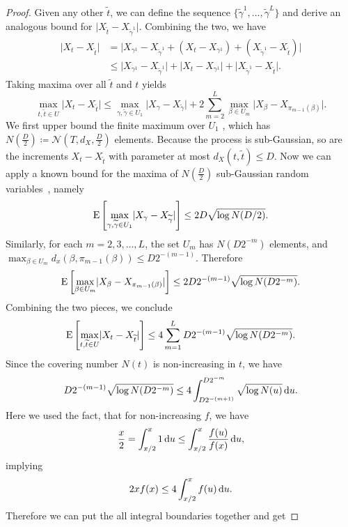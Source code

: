 \begin{proof}
Given any other $\widetilde{t}$, we can define the sequence \( \{ \widetilde{\gamma}^{1}, \dots, \widetilde{\gamma}^{L} \} \) and derive an analogous bound for \( \lvert X_{\widetilde{t}} - X_{\widetilde{\gamma}^{1}} \rvert \).
Combining the two, we have
\begin{align*}
    \lvert X_{t} - X_{\widetilde{t}} \rvert &= 
    \lvert X_{\gamma^{1}} - X_{\widetilde{\gamma}^{1}} + (X_{t} - X_{\gamma^{1}}) + (X_{\widetilde{\gamma}^{1}} - X_{\widetilde{t}}) \rvert \\
    &\leq \lvert X_{\gamma^{1}} - X_{\widetilde{\gamma}^{1}} \rvert + \lvert X_{t} - X_{\gamma^{1}} \rvert + \lvert X_{\widetilde{\gamma}^{1}} - X_{\widetilde{t}} \rvert.
\end{align*}
Taking maxima over all $\widetilde{t}$ and $t$ yields
\[
    \max_{t, \widetilde{t} \in U} \lvert X_{t} - X_{\widetilde{t}} \rvert \leq \max_{\gamma, \widetilde{\gamma} \in U_{1}} \lvert X_{\gamma}-X_{\widetilde{\gamma}}\rvert + 2 \sum_{m=2}^{L} \max_{\beta \in U_{m}} \lvert X_{\beta}- X_{\pi_{m-1}(\beta)} \rvert.
\]
We first upper bound the finite maximum over $U_{1}$ , which has \(N(\frac{D}{2}) \coloneqq \mathcal{N}(T,d_{X},\frac{D}{2}) \) elements. 
Because the process is sub-Gaussian, so are the increments \( X_{t} - X_{\widetilde{t}} \) with parameter at most \( d_{X}(t, \widetilde{t})  \leq D\). 
Now we can apply a known bound for the maxima of \( N(\frac{D}{2}) \) sub-Gaussian random variables~\cite[p. 53]{wainwright2019high}, namely
\[
    \E\left[ \max_{\gamma, \widetilde{\gamma} \in U_{1}} \lvert X_{\gamma} - X_{\widetilde{\gamma}} \rvert \right] \leq 2 D \sqrt{\log N(D/2)}.
\]
Similarly, for each \( m = 2,3, \dots, L \), the set \( U_{m} \) has \( N(D 2^{-m}) \) elements, and \( \max_{\beta \in U_{m}} d_{x}(\beta, \pi_{m-1}(\beta)) \leq D 2^{-(m-1)} \). Therefore
\[
    \E \left[ \max_{\beta \in U_{m}} \lvert X_{\beta}- X_{\pi_{m-1}(\beta)} \rvert \right] \leq 2 D 2^{-(m-1)} \sqrt{\log N(D 2^{-m})}.
\]
Combining the two pieces, we conclude
\[
    \E \left[ \max_{t, \widetilde{t} \in U} \lvert X_{t} - X_{\widetilde{t}} \rvert \right] \leq 4 \sum_{m=1}^{L} D 2^{-(m-1)} \sqrt{\log N(D 2^{-m})}.
\]
Since the covering number \( N(t) \) is non-increasing in \( t \), we have
\[
    D 2^{-(m-1)}\sqrt{\log N(D 2^{-m})} \leq 4 \int_{D 2^{-(m+1)}}^{D 2^{-m}} \sqrt{\log N(u)} \dx[u].
\]
Here we used the fact, that for non-increasing $f$, we have
\[
    \frac{x}{2} = \int_{x/2}^{x} 1 \dx[u]  \leq \int_{x/2}^{x} \frac{f(u)}{f(x)} \dx[u],
\]
implying
\[
    2x f(x) \leq 4 \int_{x/2}^{x} f(u) \dx[u].
\]
Therefore we can put the all integral boundaries together and get 

\end{proof}
